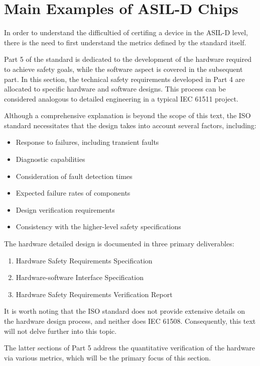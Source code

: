 \documentclass[./dissertation.tex]{subfiles}
\begin{document}
\section{Main Examples of ASIL-D Chips}

In order to understand the difficultied of certifing a device in the ASIL-D level, there is the need to first understand the metrics defined by the standard itself.

Part 5 of the standard is dedicated to the development of the hardware required to achieve safety goals, while the software aspect is covered in the subsequent part. In this section, the technical safety requirements developed in Part 4 are allocated to specific hardware and software designs. This process can be considered analogous to detailed engineering in a typical IEC 61511 project.

Although a comprehensive explanation is beyond the scope of this text, the ISO standard necessitates that the design takes into account several factors, including:

\begin{itemize}
\item Response to failures, including transient faults
\item Diagnostic capabilities
\item Consideration of fault detection times
\item Expected failure rates of components
\item Design verification requirements
\item Consistency with the higher-level safety specifications
\end{itemize}

The hardware detailed design is documented in three primary deliverables:

\begin{enumerate}
\item Hardware Safety Requirements Specification
\item Hardware-software Interface Specification
\item Hardware Safety Requirements Verification Report
\end{enumerate}

It is worth noting that the ISO standard does not provide extensive details on the hardware design process, and neither does IEC 61508. Consequently, this text will not delve further into this topic.

The latter sections of Part 5 address the quantitative verification of the hardware via various metrics, which will be the primary focus of this section.
\end{document}
